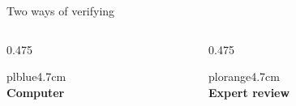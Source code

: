 \documentclass[aspectratio=169,10pt]{beamer}
\begin{document}
\begin{frame}{Two ways of verifying}
  \vfill
  \begin{columns}[c,onlytextwidth]
    \begin{column}{0.475\textwidth}
      \begin{plpanel}{plblue}{4.7cm}
        {\color{plblue}\fontsize{46}{46}\selectfont{}}\\[14pt]
        {\color{plnavy}\fontsize{23}{26}\selectfont\bfseries Computer}
      \end{plpanel}
    \end{column}
    \begin{column}{0.475\textwidth}
      \begin{plpanel}{plorange}{4.7cm}
        {\color{plorange}\fontsize{46}{46}\selectfont{}}\\[14pt]
        {\color{plnavy}\fontsize{23}{26}\selectfont\bfseries Expert review}
      \end{plpanel}
    \end{column}
  \end{columns}
  \vfill
\end{frame}
\end{document}

